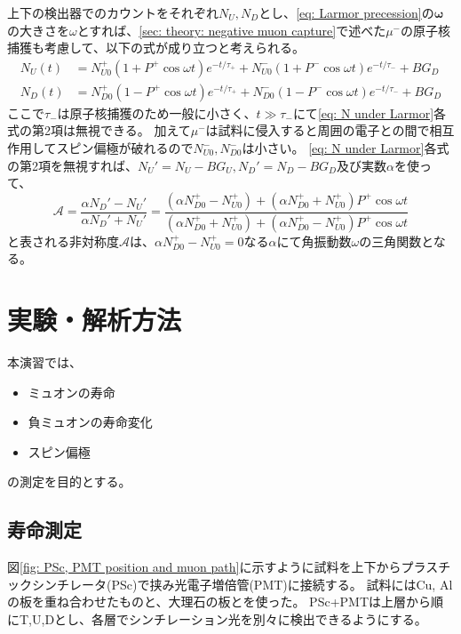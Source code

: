 \documentclass[dvipdfmx]{jsarticle}
\begin{document}
上下の検出器でのカウントをそれぞれ$N_U, N_D$とし、\eqref{eq: Larmor precession}の$\bm{\omega}$の大きさを$\omega$とすれば、\ref{sec: theory: negative muon capture}で述べた$\mu^-$の原子核捕獲も考慮して、以下の式が成り立つと考えられる。
\begin{equation}
    \label{eq: N under Larmor}
    \begin{split}
        N_U(t)
        &=
        N_{U0}^+(1+P^+\cos\omega t)e^{-t/\tau_+}
        +
        N_{U0}^-(1+P^-\cos\omega t)e^{-t/\tau_-}
        +
        BG_D
        \\
        N_D(t)
        &=
        N_{D0}^+(1-P^+\cos\omega t)e^{-t/\tau_+}
        +
        N_{D0}^-(1-P^-\cos\omega t)e^{-t/\tau_-}
        +
        BG_D
    \end{split}
\end{equation}
ここで$\tau_-$は原子核捕獲のため一般に小さく、$t\gg\tau_-$にて\eqref{eq: N under Larmor}各式の第2項は無視できる。
加えて$\mu^-$は試料に侵入すると周囲の電子との間で相互作用してスピン偏極が破れるので$N_{U0}^-,N_{D0}^-$は小さい。
\eqref{eq: N under Larmor}各式の第2項を無視すれば、$N_U'=N_U-BG_U, N_D'=N_D-BG_D$及び実数$\alpha$を使って、
\begin{equation}
    \label{eq: asymmetry}
    \mathscr{A}
    =
    \frac{\alpha N_D'-N_U'}{\alpha N_D'+N_U'}
    =
    \frac{(\alpha N_{D0}^+-N_{U0}^+)+(\alpha N_{D0}^++N_{U0}^+)P^+\cos\omega t}{(\alpha N_{D0}^++N_{U0}^+)+(\alpha N_{D0}^+-N_{U0}^+)P^+\cos\omega t}
\end{equation}
と表される非対称度$\mathscr{A}$は、$\alpha N_{D0}^+-N_{U0}^+=0$なる$\alpha$にて角振動数$\omega$の三角関数となる。


\section{実験・解析方法}

本演習では、
\begin{itemize}
    \item ミュオンの寿命
    \item 負ミュオンの寿命変化
    \item スピン偏極
\end{itemize}
の測定を目的とする。

\subsection{寿命測定}
\label{sec: method: life}

図\ref{fig: PSc, PMT position and muon path}に示すように試料を上下からプラスチックシンチレータ(PSc)で挟み光電子増倍管(PMT)に接続する。
試料にはCu, Alの板を重ね合わせたものと、大理石の板とを使った。
PSc+PMTは上層から順にT,U,Dとし、各層でシンチレーション光を別々に検出できるようにする。
\end{document}
